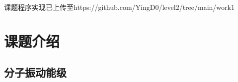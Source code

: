 \documentclass[11pt, a4paper, oneside]{ctexart}
\begin{document}
\vspace{45mm}\begin{center}
    \small{课题程序实现已上传至}\footnotesize{https://github.com/YingD0/level2/tree/main/work1}
        
\end{center}

\newpage
{}
\setcounter{page}{1}
\tableofcontents
\newpage
\setcounter{page}{1}

\section{课题介绍}
\subsection{分子振动能级}
\end{document}
